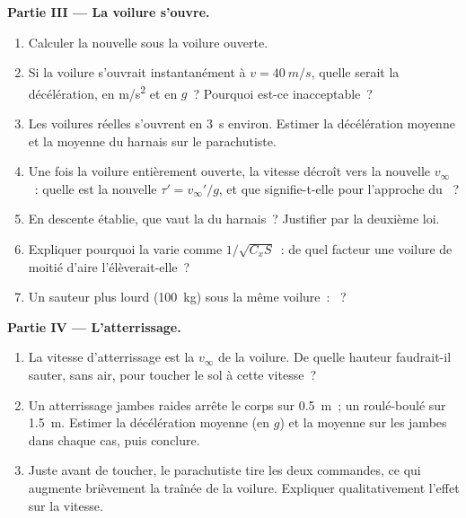 \begin{problem}
\medskip
\noindent\textbf{Partie III --- La voilure s'ouvre.}
\begin{enumerate}[resume]
  \item Calculer la nouvelle  sous la voilure ouverte.
  \item Si la voilure s'ouvrait instantanément à $v = \qty{40}{m/s}$,
        quelle serait la décélération, en \unit{m/s^2} et en $g$~?
        Pourquoi est-ce inacceptable~?
  \item Les voilures réelles s'ouvrent en \qty{3}{s} environ. Estimer la
        décélération moyenne et la  moyenne du harnais sur le
        parachutiste.
  \item Une fois la voilure entièrement ouverte, la vitesse décroît vers
        la nouvelle $v_\infty$~: quelle est la nouvelle  $\tau' = v_\infty'/g$, et que signifie-t-elle pour
        l'approche du ~?
  \item En descente établie, que vaut la  du harnais~? Justifier
        par la deuxième loi.
  \item Expliquer pourquoi la  varie comme $1/\sqrt{C_xS}$~:
        de quel facteur une voilure de moitié d'aire l'élèverait-elle~?
  \item Un sauteur plus lourd (\qty{100}{kg}) sous la même voilure~:
        ~?
\end{enumerate}

\medskip
\noindent\textbf{Partie IV --- L'atterrissage.}
\begin{enumerate}[resume]
  \item La vitesse d'atterrissage est la $v_\infty$ de la voilure. De
        quelle hauteur faudrait-il sauter, sans air, pour toucher le sol
        à cette vitesse~?
  \item Un atterrissage jambes raides arrête le corps sur \qty{0.5}{m}~;
        un roulé-boulé sur \qty{1.5}{m}. Estimer la décélération moyenne
        (en $g$) et la  moyenne sur les jambes dans chaque cas, puis
        conclure.
  \item Juste avant de toucher, le parachutiste tire les deux
        commandes, ce qui augmente brièvement la traînée de la voilure.
        Expliquer qualitativement l'effet sur la vitesse.
\end{enumerate}


\end{problem}
